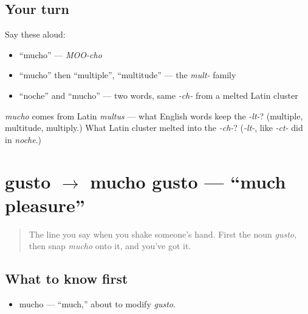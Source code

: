 \subsection*{Your turn}
Say these aloud:

\begin{itemize}
\raggedright
  \item \textquotedblleft{}mucho\textquotedblright{} — \emph{MOO-cho}
  \item \textquotedblleft{}mucho\textquotedblright{} then \textquotedblleft{}multiple\textquotedblright{}, \textquotedblleft{}multitude\textquotedblright{} — the \emph{mult-} family
  \item \textquotedblleft{}noche\textquotedblright{} and \textquotedblleft{}mucho\textquotedblright{} — two words, same \emph{-ch-} from a melted Latin cluster
\end{itemize}

\begin{tcolorbox}[breakable,colback=teal!4,colframe=teal!35!black,title={Before you move on}]
\emph{mucho} comes from Latin \emph{multus} — what English words keep the \emph{-lt-}? (multiple, multitude, multiply.) What Latin cluster melted into the \emph{-ch-}? (\emph{-lt-}, like \emph{-ct-} did in \emph{noche}.)
\end{tcolorbox}
\section[mucho gusto]{gusto $\to$ mucho gusto — \textquotedblleft{}much pleasure\textquotedblright{}}

\label{lesson:ES-C03-gusto}



\begin{quote}
The line you say when you shake someone's hand. First the noun \emph{gusto}, then snap \emph{mucho} onto it, and you've got it.
\end{quote}

\subsection*{What to know first}
\begin{itemize}
\raggedright
  \item mucho — \textquotedblleft{}much,\textquotedblright{} about to modify \emph{gusto}.
\end{itemize}

